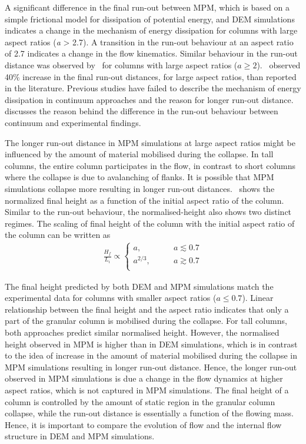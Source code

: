 A significant difference in the final run-out between MPM, which is based on a 
simple frictional model for dissipation of potential energy, and DEM 
simulations indicates a change in the mechanism of energy 
dissipation for columns with large aspect ratios (\textit{a} > 
2.7). A transition in the run-out behaviour at an aspect ratio of 2.7 indicates 
a change in the flow kinematics. Similar behaviour in the run-out distance was 
observed by~\citet{Bandara2013} for columns with large aspect ratios ($a \ge 
2$).~\citet{Mast2014} observed 40\% increase in the final run-out distances, 
for large aspect ratios, than reported in the literature. Previous studies have 
failed to describe the mechanism of energy dissipation in continuum approaches 
and the reason for longer run-out distance.~ discusses the 
reason behind the difference in the run-out behaviour between continuum and 
experimental findings.

The longer run-out distance in MPM simulations at large aspect ratios might be 
influenced by the amount of material mobilised during the collapse. In tall 
columns, the entire column participates in the flow, in contrast to short 
columns where the collapse is due to avalanching of 
flanks. It is possible that MPM simulations 
collapse more resulting in longer run-out distances.~ shows 
the normalized final height as a function of the initial aspect ratio of the 
column. Similar to the run-out behaviour, the normalised-height also shows two 
distinct regimes. The scaling of final height of the column with the initial 
aspect ratio of the column can be written as
\begin{align}
\frac{H_{\textit{f}}}{L_{\textit{i}}} \propto  
\begin{cases}
\textit{a}, \qquad & \textit{a}\lesssim0.7 \\
\textit{a}^{2/3}, \qquad & \textit{a}\gtrsim0.7 \\
\end{cases}
\end{align} 

The final height predicted by both DEM and MPM simulations match the 
experimental data for columns with smaller aspect ratios ($a \le 0.7$). Linear 
relationship between the final height and the aspect ratio indicates that only 
a part of the granular column is mobilised during the collapse. For tall 
columns, both approaches predict similar normalised height. However, the 
normalised height observed in MPM is higher than in DEM simulations, which is 
in contrast to the idea of increase in the amount of material mobilised during 
the collapse in MPM simulations resulting in longer run-out distance. Hence, 
the longer run-out observed in MPM simulations is due a change in the 
flow dynamics at higher aspect ratios, which is not captured in MPM 
simulations. The final height of a column is controlled by the amount of static 
region in the granular column collapse, while the run-out distance is 
essentially a function of the flowing mass. Hence, it is important to compare 
the evolution of flow and the internal flow structure in DEM and MPM 
simulations.

